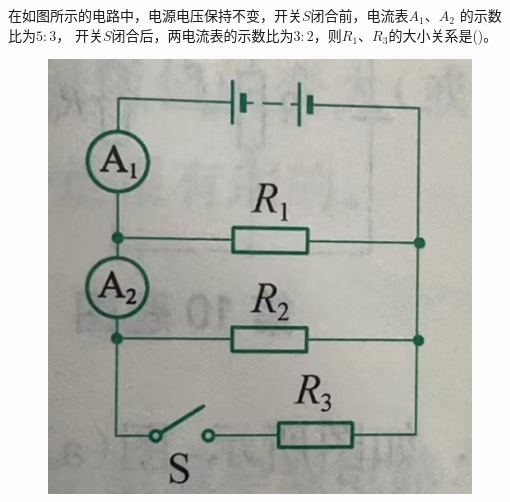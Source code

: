 \documentclass[a4paper,cs4size]{BHCexam}
\begin{document}
\begin{groups}
\begin{questions}[]
        \question[5]在如图所示的电路中，电源电压保持不变，开关$S$闭合前，电流表$A_1$、$A_2$ 的示数比为$5:3$，
        开关$S$闭合后，两电流表的示数比为$3:2$，则$R_1$、$R_3$的大小关系是(\quad\quad\quad)。
        \begin{figure}[htb]
            \flushright
            \includegraphics [scale=0.4,trim=0 0 0 0]{./image/physics_circuit2_6.png}
            \label{fig:fig_circuit2_6}
        \end{figure}
        \vspace{2.5cm}


\end{questions}
\end{groups}
\end{document}
